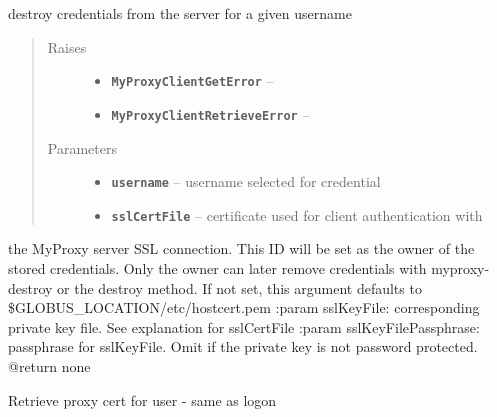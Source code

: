 \documentclass[letterpaper,10pt,english]{sphinxmanual}
\begin{document}
\begin{fulllineitems}
\begin{fulllineitems}
\end{fulllineitems}


\begin{fulllineitems}
\label{client:myproxy.client.MyProxyClient.destroy}
destroy credentials from the server for a given username
\begin{quote}\begin{description}
\item[{Raises}] \leavevmode\begin{itemize}
\item {} 
\textbf{\texttt{MyProxyClientGetError}} -- 

\item {} 
\textbf{\texttt{MyProxyClientRetrieveError}} -- 

\end{itemize}

\item[{Parameters}] \leavevmode\begin{itemize}
\item {} 
\textbf{\texttt{username}} -- username selected for credential

\item {} 
\textbf{\texttt{sslCertFile}} -- certificate used for client authentication with

\end{itemize}

\end{description}\end{quote}

the MyProxy server SSL connection.  This ID will be set as the owner
of the stored credentials.  Only the owner can later remove 
credentials with myproxy-destroy or the destroy method.  If not set,
this argument defaults to \$GLOBUS\_LOCATION/etc/hostcert.pem 
:param sslKeyFile: corresponding private key file.  See explanation
for sslCertFile
:param sslKeyFilePassphrase: passphrase for sslKeyFile.  Omit if the
private key is not password protected.  
@return none

\end{fulllineitems}


\begin{fulllineitems}
\label{client:myproxy.client.MyProxyClient.getDelegation}
Retrieve proxy cert for user - same as logon


\end{fulllineitems}
\end{fulllineitems}
\end{document}
